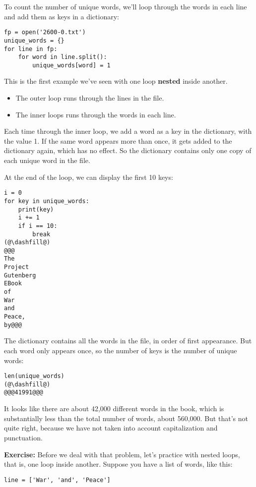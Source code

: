 To count the number of unique words, we'll loop through the words in
each line and add them as keys in a dictionary:

\begin{lstlisting}[]
fp = open('2600-0.txt')
unique_words = {}
for line in fp:
    for word in line.split():
        unique_words[word] = 1
\end{lstlisting}

This is the first example we've seen with one loop \textbf{nested}
inside another.

\begin{itemize}
\item
  The outer loop runs through the lines in the file.
\item
  The inner loops runs through the words in each line.
\end{itemize}

Each time through the inner loop, we add a word as a key in the
dictionary, with the value 1. If the same word appears more than once,
it gets added to the dictionary again, which has no effect. So the
dictionary contains only one copy of each unique word in the file.

At the end of the loop, we can display the first 10 keys:

\begin{lstlisting}[]
i = 0
for key in unique_words:
    print(key)
    i += 1
    if i == 10:
        break
(@\dashfill@)
@@@
The
Project
Gutenberg
EBook
of
War
and
Peace,
by@@@
\end{lstlisting}

The dictionary contains all the words in the file, in order of first
appearance. But each word only appears once, so the number of keys is
the number of unique words:

\begin{lstlisting}[]
len(unique_words)
(@\dashfill@)
@@@41991@@@
\end{lstlisting}

It looks like there are about 42,000 different words in the book, which
is substantially less than the total number of words, about 560,000. But
that's not quite right, because we have not taken into account
capitalization and punctuation.

\textbf{Exercise:} Before we deal with that problem, let's practice with
nested loops, that is, one loop inside another. Suppose you have a list
of words, like this:

\begin{lstlisting}[]
line = ['War', 'and', 'Peace']
\end{lstlisting}

